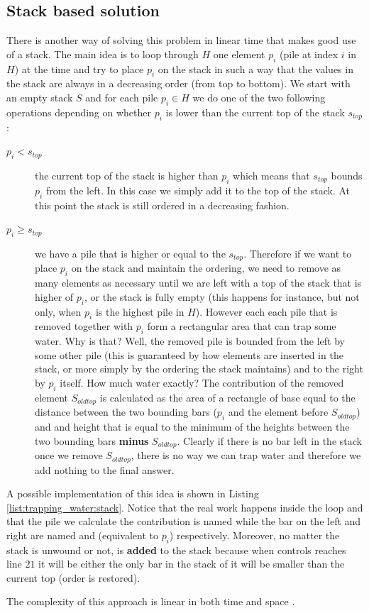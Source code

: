 \subsection{Stack based solution}
\label{trapping_water:sec:stack}
There is another way of solving this problem in linear time that makes good use of a stack. The main idea is to loop through $H$ one element $p_i$ (pile at index $i$ in $H$) at the time and try to place $p_i$ on the stack in such a way that the values in the stack are always in a decreasing order (from top to bottom).
We start with an empty stack $S$ and for each pile $p_i \in H$ we do one of the two following operations depending on whether $p_i$  is lower than the current top of the stack $s_{top}$:
\begin{description}
	\item[$p_i < s_{top}$] the current top of the stack is higher than $p_i$ which means that $s_{top}$ bounds $p_i$ from the left. In this case we simply add it to the top of the stack. At this point the stack is still ordered in a decreasing fashion.
	\item[$p_i \geq s_{top}$] we have a pile that is higher or equal to the $s_{top}$. Therefore if we want to place $p_i$ on the stack and maintain the ordering, we need to remove as many elements as necessary until we are left with a top of the stack that is higher of $p_i$, or the stack is fully empty (this happens for instance, but not only, when $p_i$ is the highest pile in $H$).
	However each each pile that is removed together with $p_i$  form a rectangular area that can trap some water. Why is that? Well, the removed pile is bounded from the left by some other pile (this is guaranteed by how elements are inserted in the stack, or more simply by the ordering the stack maintains) and to the right by $p_i$ itself. 
	How much water exactly? 
	The contribution of the removed element $S_{oldtop}$ is calculated as the area of a rectangle of base equal to the distance between the two bounding bars ($p_i$ and the element before $S_{oldtop}$) and and height that is equal to the minimum of the heights between the two bounding bars \textbf{minus} $S_{oldtop}$. Clearly if there is no bar left in the stack once we remove $S_{oldtop}$, there is no way we can trap water and therefore we add nothing to the final answer. 
\end{description}

A possible implementation of this idea is shown in Listing \ref{list:trapping_water:stack}.
Notice that the real work happens inside the  loop and that the pile we calculate the contribution is named  while the bar on the left and right are named  and  (equivalent to $p_i$) respectively. 
Moreover, no matter the stack is unwound or not,  is \textbf{added} to the stack because when controls reaches line $21$ it will be either the only bar in the stack of it will be smaller than the current top (order is restored).

The complexity of this approach is linear in both time and space .



 
